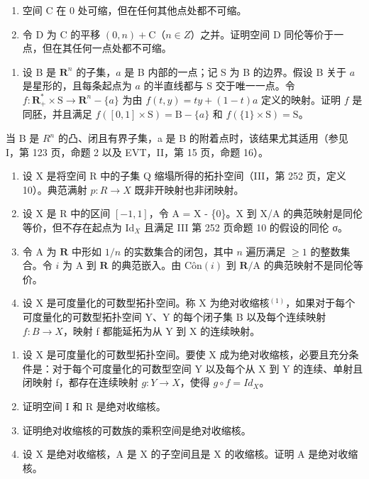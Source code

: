 \begin{enumerate}
\def\labelenumi{\alph{enumi})}
\item
  空间 C 在 0 处可缩，但在任何其他点处都不可缩。
\item
  令 D 为 C 的平移 \((0, n) + \mathrm{C}\)（\(n \in Z\)）之并。证明空间 D 同伦等价于一点，但在其任何一点处都不可缩。
\end{enumerate}

\begin{enumerate}
\def\labelenumi{\arabic{enumi})}
\setcounter{enumi}{1}
\tightlist
\item
  设 B 是 \(\mathbf{R}^{n}\) 的子集，\(a\) 是 B 内部的一点；记 S 为 B 的边界。假设 B 关于 \(a\) 是星形的，且每条起点为 \(a\) 的半直线都与 S 交于唯一一点。令 \(f\colon\mathbf{R}_{+}^{*}\times\mathrm{S}\to\mathbf{R}^{n}-\{a\}\) 为由 \(f(t,y)=ty+(1-t)a\) 定义的映射。证明 \(f\) 是同胚，并且满足 \(f([0,1]\times\mathrm{S})=\mathrm{B}-\{a\}\) 和 \(f(\{1\}\times\mathrm{S})=\mathrm{S}\)。
\end{enumerate}

当 B 是 \(R^{n}\) 的凸、闭且有界子集，a 是 B 的附着点时，该结果尤其适用（参见 I，第 123 页，命题 2 以及 EVT，II，第 15 页，命题 16）。

\begin{enumerate}
\def\labelenumi{\arabic{enumi})}
\setcounter{enumi}{2}
\item
  设 X 是将空间 R 中的子集 Q 缩塌所得的拓扑空间（III，第 252 页，定义 10）。典范满射 \(p: R \rightarrow X\) 既非开映射也非闭映射。
\item
  设 X 是 R 中的区间 \([-1,1]\)，令 A = X - \{0\}。X 到 X/A 的典范映射是同伦等价，但不存在起点为 \(\mathrm{Id}_{X}\) 且满足 III 第 252 页命题 10 的假设的同伦 σ。
\item
  令 A 为 \(\mathbf{R}\) 中形如 \(1/n\) 的实数集合的闭包，其中 \(n\) 遍历满足 \(\geqslant 1\) 的整数集合。令 \(i\) 为 A 到 \(\mathbf{R}\) 的典范嵌入。由 \(\mathrm{Côn}(i)\) 到 \(\mathbf{R}/\mathrm{A}\) 的典范映射不是同伦等价。
\item
  设 X 是可度量化的可数型拓扑空间。称 X 为绝对收缩核\(^{(1)}\)，如果对于每个可度量化的可数型拓扑空间 Y、Y 的每个闭子集 B 以及每个连续映射 \(f: B \to X\)，映射 f 都能延拓为从 Y 到 X 的连续映射。
\end{enumerate}

\begin{enumerate}
\def\labelenumi{\alph{enumi})}
\item
  设 X 是可度量化的可数型拓扑空间。要使 X 成为绝对收缩核，必要且充分条件是：对于每个可度量化的可数型空间 Y 以及每个从 X 到 Y 的连续、单射且闭映射 f，都存在连续映射 \(g: Y \to X\)，使得 \(g \circ f = Id_{X}\)。
\item
  证明空间 I 和 R 是绝对收缩核。
\item
  证明绝对收缩核的可数族的乘积空间是绝对收缩核。
\item
  设 X 是绝对收缩核，A 是 X 的子空间且是 X 的收缩核。证明 A 是绝对收缩核。
\end{enumerate}

